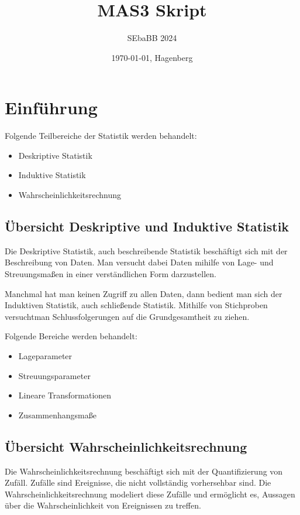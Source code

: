\documentclass[12pt]{scrartcl}
\title{MAS3 Skript}
\author{SEbaBB 2024}
\date{\today{}, Hagenberg}
\begin{document}
\maketitle
\tableofcontents

\pagebreak

\section{Einführung}

Folgende Teilbereiche der Statistik werden behandelt:
\begin{itemize}
    \item Deskriptive Statistik
    \item Induktive Statistik
    \item Wahrscheinlichkeitsrechnung
\end{itemize}

\subsection{Übersicht Deskriptive und Induktive Statistik}

Die Deskriptive Statistik, auch beschreibende Statistik beschäftigt sich mit der Beschreibung von Daten.
Man versucht dabei Daten mihilfe von Lage- und Streuungsmaßen in einer verständlichen Form darzustellen.\par

Manchmal hat man keinen Zugriff zu allen Daten, dann bedient man sich der Induktiven Statistik, auch schließende Statistik. Mithilfe von Stichproben versuchtman Schlussfolgerungen auf die Grundgesamtheit zu ziehen.

Folgende Bereiche werden behandelt:
\begin{itemize}
    \item Lageparameter
    \item Streuungsparameter
    \item Lineare Transformationen
    \item Zusammenhangsmaße
\end{itemize}

\subsection{Übersicht Wahrscheinlichkeitsrechnung}

Die Wahrscheinlichkeitsrechnung beschäftigt sich mit der Quantifizierung von Zufäll. Zufälle sind Ereignisse, die nicht vollständig vorhersehbar sind.
Die Wahrscheinlichkeitsrechnung modeliert diese Zufälle und ermöglicht es, Aussagen über die Wahrscheinlichkeit von Ereignissen zu treffen.
\end{document}
